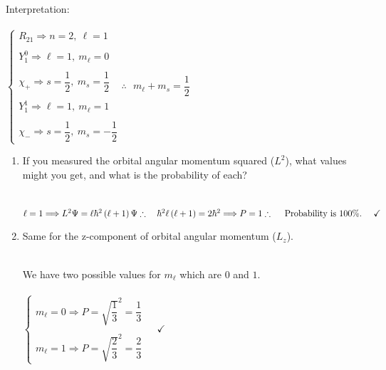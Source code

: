 \documentclass[fleqn]{article}
\begin{document}
\begin{enumerate}
    \textcolor{hwColor}{
      \\
      Interpretation:
      \\
      \\
      $
        \begin{cases}
          R_{21} \Longrightarrow n=2, ~ \ell=1
          \\
          \\
          Y_1^0 \Longrightarrow \ell=1, ~ m_{\ell}=0
          \\
          \\
          \chi_+ \Longrightarrow s=\dfrac{1}{2}, ~ m_s=\dfrac{1}{2}
          \\
          \\
          Y_1^1 \Longrightarrow \ell=1, ~ m_{\ell}=1
          \\
          \\
          \chi_- \Longrightarrow s=\dfrac{1}{2}, ~ m_s=-\dfrac{1}{2}
        \end{cases}
        \therefore ~~~ m_{\ell}+m_s=\dfrac{1}{2}
      $
    }

    \begin{enumerate}
      \item If you measured the orbital angular momentum squared ($L^2$), what values might you get,
      and what is the probability of each?

        \textcolor{hwColor}{
          \\
          $
            \ell=1 \Longrightarrow L^2 \Psi=\ell \hbar^2 \left(\ell+1\right) \Psi
            \\
            \\
            \therefore ~~~ \hbar^2 \ell \left(\ell+1\right)=2 \hbar^2 \Longrightarrow P=1
            \\
            \\
            \therefore ~~~~ \text{Probability is $100\%$}. ~~~~ \checkmark
          $
          \\
        }

      \item Same for the z-component of orbital angular momentum ($L_z$).

        \textcolor{hwColor}{
          \\
          We have two possible values for $m_{\ell}$ which are $0$ and $1$.
          \\
          \\
          $
            \begin{cases}
              m_{\ell}=0 \Longrightarrow P=\sqrt{\dfrac{1}{3}}^2=\dfrac{1}{3}
              \\
              \\
              m_{\ell}=1 \Longrightarrow P=\sqrt{\dfrac{2}{3}}^2=\dfrac{2}{3}
            \end{cases} ~~~~~ \checkmark
          $
          \\
        }


\end{enumerate}
\end{enumerate}
\end{document}
